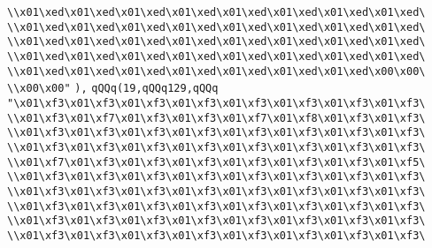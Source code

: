 \verb|\\x01\xed\x01\xed\x01\xed\x01\xed\x01\xed\x01\xed\x01\xed\x01\xed\|\newline
\verb|\\x01\xed\x01\xed\x01\xed\x01\xed\x01\xed\x01\xed\x01\xed\x01\xed\|\newline
\verb|\\x01\xed\x01\xed\x01\xed\x01\xed\x01\xed\x01\xed\x01\xed\x01\xed\|\newline
\verb|\\x01\xed\x01\xed\x01\xed\x01\xed\x01\xed\x01\xed\x01\xed\x01\xed\|\newline
\verb|\\x01\xed\x01\xed\x01\xed\x01\xed\x01\xed\x01\xed\x01\xed\x00\x00\|\newline
\verb|\\x00\x00"|\newline
\verb|),|\newline
\verb|qQQq(19,qQQq129,qQQq|\newline
\verb|"\x01\xf3\x01\xf3\x01\xf3\x01\xf3\x01\xf3\x01\xf3\x01\xf3\x01\xf3\|\newline
\verb|\\x01\xf3\x01\xf7\x01\xf3\x01\xf3\x01\xf7\x01\xf8\x01\xf3\x01\xf3\|\newline
\verb|\\x01\xf3\x01\xf3\x01\xf3\x01\xf3\x01\xf3\x01\xf3\x01\xf3\x01\xf3\|\newline
\verb|\\x01\xf3\x01\xf3\x01\xf3\x01\xf3\x01\xf3\x01\xf3\x01\xf3\x01\xf3\|\newline
\verb|\\x01\xf7\x01\xf3\x01\xf3\x01\xf3\x01\xf3\x01\xf3\x01\xf3\x01\xf5\|\newline
\verb|\\x01\xf3\x01\xf3\x01\xf3\x01\xf3\x01\xf3\x01\xf3\x01\xf3\x01\xf3\|\newline
\verb|\\x01\xf3\x01\xf3\x01\xf3\x01\xf3\x01\xf3\x01\xf3\x01\xf3\x01\xf3\|\newline
\verb|\\x01\xf3\x01\xf3\x01\xf3\x01\xf3\x01\xf3\x01\xf3\x01\xf3\x01\xf3\|\newline
\verb|\\x01\xf3\x01\xf3\x01\xf3\x01\xf3\x01\xf3\x01\xf3\x01\xf3\x01\xf3\|\newline
\verb|\\x01\xf3\x01\xf3\x01\xf3\x01\xf3\x01\xf3\x01\xf3\x01\xf3\x01\xf3\|\newline
